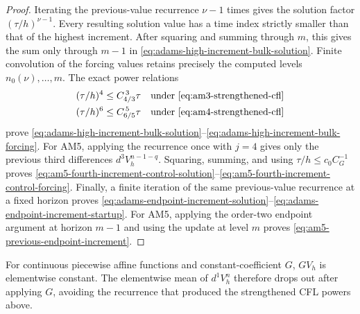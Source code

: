\documentclass[11pt]{article}
\begin{document}
\begin{proof}
Iterating the previous-value recurrence \(\nu-1\) times gives the solution
factor \((\tau/h)^{\nu-1}\). Every resulting solution value has a time index
strictly smaller than that of the highest increment. After squaring and
summing through \(m\), this gives the sum only through \(m-1\) in
\eqref{eq:adams-high-increment-bulk-solution}. Finite convolution of the
forcing values retains precisely the computed levels \(n_0(\nu),\ldots,m\).
The exact power relations
\begin{align}
(\tau/h)^4&\le C_{4/3}^{\,3}\tau
&&\text{under \eqref{eq:am3-strengthened-cfl}} \label{eq:am3-cfl-power}\\
(\tau/h)^6&\le C_{6/5}^{\,5}\tau
&&\text{under \eqref{eq:am4-strengthened-cfl}} \label{eq:am4-cfl-power}
\end{align}
prove \eqref{eq:adams-high-increment-bulk-solution}--\eqref{eq:adams-high-increment-bulk-forcing}.
For AM5, applying the recurrence once with \(j=4\) gives only the previous
third differences \(d^3V_h^{n-1-q}\). Squaring, summing, and using
\(\tau/h\le c_0C_G^{-1}\) proves
\eqref{eq:am5-fourth-increment-control-solution}--\eqref{eq:am5-fourth-increment-control-forcing}.
Finally, a finite iteration of the same previous-value recurrence at a fixed
horizon proves \eqref{eq:adams-endpoint-increment-solution}--\eqref{eq:adams-endpoint-increment-startup}.
For AM5, applying the order-two endpoint argument at horizon \(m-1\) and
using the update at level \(m\) proves \eqref{eq:am5-previous-endpoint-increment}.
\end{proof}


For continuous piecewise affine functions and constant-coefficient \(G\),
\(GV_h\) is elementwise constant. The elementwise mean of \(d^1V_h^n\)
therefore drops out after applying \(G\), avoiding the recurrence that
produced the strengthened CFL powers above.
\end{document}
